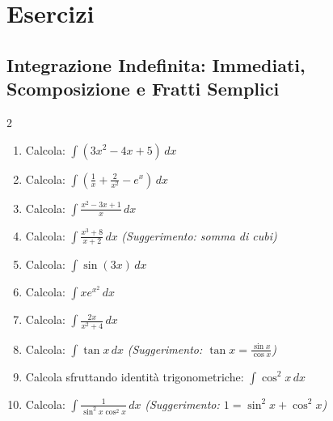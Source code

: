 \section{Esercizi}

\subsection{Integrazione Indefinita: Immediati, Scomposizione e Fratti Semplici}
\begin{multicols}{2}
\begin{enumerate}
    \item {} Calcola: $\int (3x^2 - 4x + 5) \, dx$
    \item {} Calcola: $\int \left(\frac{1}{x} + \frac{2}{x^2} - e^x\right) \, dx$
    \item {} Calcola: $\int \frac{x^2 - 3x + 1}{x} \, dx$
    \item {} Calcola: $\int \frac{x^3 + 8}{x+2} \, dx$ \textit{(Suggerimento: somma di cubi)}
    \item {} Calcola: $\int \sin(3x) \, dx$
    \item {} Calcola: $\int x e^{x^2} \, dx$
    \item {} Calcola: $\int \frac{2x}{x^2+4} \, dx$
    \item {} Calcola: $\int \tan x \, dx$ \textit{(Suggerimento: $\tan x = \frac{\sin x}{\cos x}$)}
    \item {} Calcola sfruttando identità trigonometriche: $\int \cos^2 x \, dx$
    \item {} Calcola: $\int \frac{1}{\sin^2 x \cos^2 x} \, dx$ \textit{(Suggerimento: $1 = \sin^2 x + \cos^2 x$)}
    

\end{enumerate}
\end{multicols}
